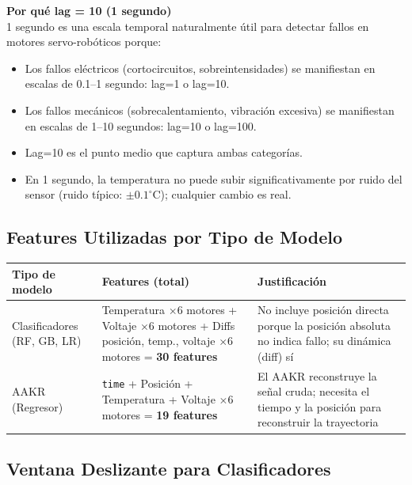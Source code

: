 \documentclass[12pt,a4paper]{article}
\begin{document}
\begin{porquebox}
\textbf{Por qu\'{e} lag = 10 (1 segundo)} \\[4pt]
1 segundo es una escala temporal naturalmente \'{u}til para detectar fallos en motores
servo-rob\'{o}ticos porque:
\begin{itemize}[itemsep=2pt]
  \item Los fallos el\'{e}ctricos (cortocircuitos, sobreintensidades) se manifiestan en
    escalas de 0.1--1 segundo: lag=1 o lag=10.
  \item Los fallos mec\'{a}nicos (sobrecalentamiento, vibraci\'{o}n excesiva) se manifiestan
    en escalas de 1--10 segundos: lag=10 o lag=100.
  \item Lag=10 es el punto medio que captura ambas categor\'{i}as.
  \item En 1 segundo, la temperatura no puede subir significativamente por ruido del
    sensor (ruido t\'{i}pico: $\pm 0.1^\circ$C); cualquier cambio es real.
\end{itemize}
\end{porquebox}

\subsection{Features Utilizadas por Tipo de Modelo}

\begin{center}
\begin{tabularx}{\textwidth}{lXX}
\toprule
\textbf{Tipo de modelo} & \textbf{Features (total)} & \textbf{Justificaci\'{o}n} \\
\midrule
Clasificadores (RF, GB, LR) &
  Temperatura $\times 6$ motores + Voltaje $\times 6$ motores + Diffs posici\'{o}n, temp., voltaje $\times 6$ motores = \textbf{30 features} &
  No incluye posici\'{o}n directa porque la posici\'{o}n absoluta no indica fallo; su din\'{a}mica (diff) s\'{i} \\
\addlinespace
AAKR (Regresor) &
  \texttt{time} + Posici\'{o}n + Temperatura + Voltaje $\times 6$ motores = \textbf{19 features} &
  El AAKR reconstruye la se\~{n}al cruda; necesita el tiempo y la posici\'{o}n para reconstruir la trayectoria \\
\bottomrule
\end{tabularx}
\end{center}

\subsection{Ventana Deslizante para Clasificadores}
\end{document}
